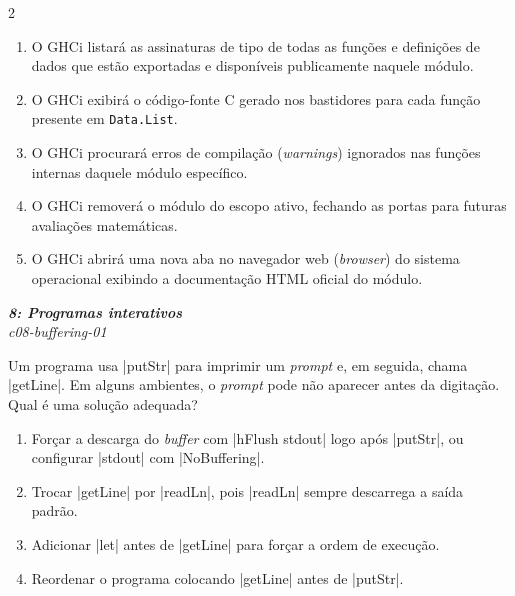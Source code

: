 \documentclass[a4paper,10pt,brazil]{article}
\begin{document}
\begin{multicols}{2}
\begin{enumerate}
  \item O GHCi listará as assinaturas de tipo de todas as funções e definições de dados que estão exportadas e disponíveis publicamente naquele módulo.

  \item O GHCi exibirá o código-fonte C gerado nos bastidores para cada função presente em \texttt{Data.List}.

  \item O GHCi procurará erros de compilação (\emph{warnings}) ignorados nas funções internas daquele módulo específico.

  \item O GHCi removerá o módulo do escopo ativo, fechando as portas para futuras avaliações matemáticas.

  \item O GHCi abrirá uma nova aba no navegador web (\emph{browser}) do sistema operacional exibindo a documentação HTML oficial do módulo.


\end{enumerate}

\begin{flushright}
  \footnotesize
  \textit{\textbf{8: Programas interativos}}\\
  \textit{c08-buffering-01}\\

\end{flushright}
Um programa usa \haskellinline|putStr| para imprimir um \emph{prompt} e, em seguida, chama \haskellinline|getLine|. Em alguns ambientes, o \emph{prompt} pode não aparecer antes da digitação. Qual é uma solução adequada?

\begin{enumerate}
  \item Forçar a descarga do \emph{buffer} com \haskellinline|hFlush stdout| logo após \haskellinline|putStr|, ou configurar \haskellinline|stdout| com \haskellinline|NoBuffering|.

  \item Trocar \haskellinline|getLine| por \haskellinline|readLn|, pois \haskellinline|readLn| sempre descarrega a saída padrão.

  \item Adicionar \haskellinline|let| antes de \haskellinline|getLine| para forçar a ordem de execução.

  \item Reordenar o programa colocando \haskellinline|getLine| antes de \haskellinline|putStr|.


\end{enumerate}
\end{multicols}
\end{document}
